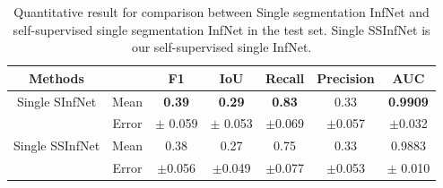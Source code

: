  \begin{table}[!ht]
 	\centering
 	\begin{tabular}{| c | c || c c c c c ||}
 		\hline
 		Methods & & F1 & IoU & Recall & Precision & AUC \\ \hline
 		Single SInfNet &  Mean & \textbf{0.39} & \textbf{0.29} & \textbf{0.83} & 0.33 & \textbf{0.9909} \\ \cline{2-7}
 		& Error & $\pm$ 0.059 & $\pm$ 0.053 & $\pm$0.069 & $\pm$0.057  & $\pm$0.032 \\ \hline
 		Single SSInfNet &  Mean & 0.38 & 0.27 & 0.75 & 0.33 & 0.9883  \\ \cline{2-7}
 		& Error & $\pm$0.056 & $\pm$0.049 &$\pm$0.077  & $\pm$0.053 & $\pm$  0.010 \\ \hline
 	\end{tabular}
 	\caption{Quantitative result for comparison between Single segmentation InfNet and self-supervised single segmentation InfNet in the test set. Single SSInfNet is our self-supervised single InfNet.}
 	\label{tab:single}
 \end{table}


